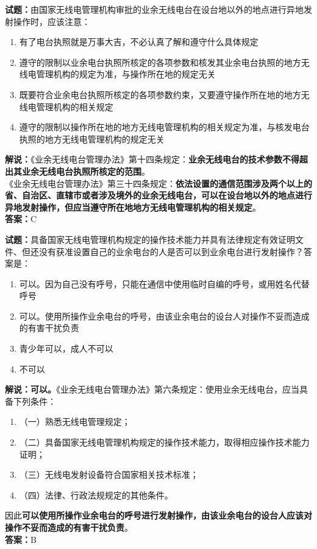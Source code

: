 \documentclass{ctexbook}
\begin{document}
\noindent\textbf{试题：}由国家无线电管理机构审批的业余无线电台在设台地以外的地点进行异地发射操作时，应该注意：
\begin{enumerate}[leftmargin=3em]
	\item 有了电台执照就是万事大吉，不必认真了解和遵守什么具体规定
	\item 遵守的限制以业余电台执照所核定的各项参数和核发其业余电台执照的地方无线电管理机构的规定为准，与操作所在地的规定无关
	\item 既要符合业余电台执照所核定的各项参数约束，又要遵守操作所在地的地方无线电管理机构的相关规定
	\item 遵守的限制以操作所在地的地方无线电管理机构的相关规定为准，与核发电台执照的地方无线电管理机构的规定无关
\end{enumerate}
\noindent\textbf{解说：}《业余无线电台管理办法》第十四条规定：\textbf{业余无线电台的技术参数不得超出其业余无线电台执照所核定的范围}。\\
《业余无线电台管理办法》第三十四条规定：\textbf{依法设置的通信范围涉及两个以上的省、自治区、直辖市或者涉及境外的业余无线电台，可以在设台地以外的地点进行异地发射操作，但应当遵守所在地地方无线电管理机构的相关规定}。\\\noindent\textbf{答案：}C




\bigskip


\noindent\textbf{试题：}具备国家无线电管理机构规定的操作技术能力并具有法律规定有效证明文件、但还没有获准设置自己的业余电台的人是否可以到业余电台进行发射操作？答案是：
\begin{enumerate}[leftmargin=3em]
	\item 可以。因为自己没有呼号，只能在通信中使用临时自编的呼号，或用姓名代替呼号
	\item 可以。使用所操作业余电台的呼号，由该业余电台的设台人对操作不妥而造成的有害干扰负责
	\item 青少年可以，成人不可以
	\item 不可以
\end{enumerate}
\noindent\textbf{解说：可以。}《业余无线电台管理办法》第六条规定：使用业余无线电台，应当具备下列条件：
\begin{enumerate}[label=, leftmargin=1em]
	\item （一）熟悉无线电管理规定；
	\item （二）具备国家无线电管理机构规定的操作技术能力，取得相应操作技术能力证明；
	\item （三）无线电发射设备符合国家相关技术标准；
	\item （四）法律、行政法规规定的其他条件。
\end{enumerate}
因此\textbf{可以使用所操作业余电台的呼号进行发射操作，由该业余电台的设台人应该对操作不妥而造成的有害干扰负责}。\\\noindent\textbf{答案：}B
\end{document}
